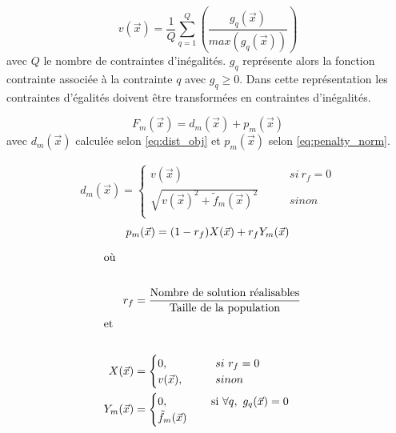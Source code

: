 \begin{equation}\label{eq:norm_contrainte}
  v(\vec{x}) = \frac{1}{Q} \sum_{q=1}^{Q} \left(\frac{g_{q}(\vec{x})}{max(g_{q}(\vec{x}))}\right)
\end{equation}
avec $Q$ le nombre de contraintes d’inégalités. $g_{q}$ représente alors la fonction contrainte
associée à la contrainte $q$ avec $g_{q} \geq 0$. Dans cette représentation les contraintes
d’égalités doivent être transformées en contraintes d’inégalités.

\begin{equation}\label{eq:calc_modif_obj}
  F_{m}(\vec{x}) = d_{m}(\vec{x}) + p_{m}(\vec{x})
\end{equation}
avec $d_{m}(\vec{x})$ calculée selon \eqref{eq:dist_obj} et $ p_{m}(\vec{x})$ selon \eqref{eq:penalty_norm}.


\begin{align}\label{eq:dist_obj}
  d_{m}(\vec{x}) = \begin{cases}
                          v(\vec{x})                                     & \qquad si\  r_{f} = 0 \\
                          \sqrt{v(\vec{x})^2 + \tilde{f}_{m}(\vec{x})^2} & \qquad sinon          \\
                    \end{cases}
\end{align}
\begin{equation}\label{eq:penalty_norm}
  p_{m}(\vec{x}) = (1 - r_{f})  X(\vec{x}) + r_{f} Y_{m}(\vec{x}) \\
\end{equation}

\begin{align*}
  \shortintertext{où} \\
    r_{f} &= \frac{\text{Nombre de solution réalisables}}{\text{Taille de la population}} \\
  \shortintertext{et} \\
  X(\vec{x})     &= \begin{cases}
                0,          \qquad     & si\  r_{f} = 0\\
                v(\vec{x}), \qquad     & sinon\\
                \end{cases} \\
  Y_{m}(\vec{x}) &= \begin{cases}
                    0,          \quad \qquad & \text{si} \ \forall q, \ g_{q}(\vec{x}) = 0\\
                      \tilde{f}_{m}(\vec{x})  \\
            \end{cases}\\
\end{align*}

